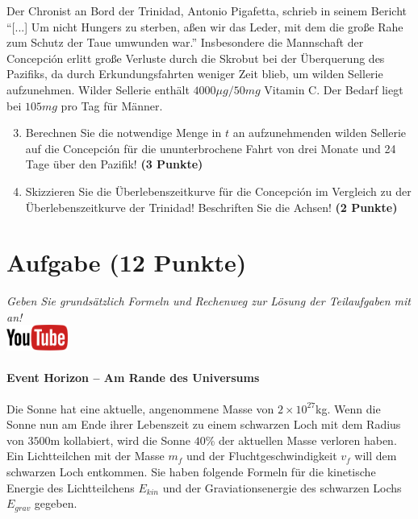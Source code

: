 \documentclass[a4paper, 9pt]{scrartcl}\usepackage[]{graphicx}\usepackage[]{xcolor}
\begin{document}
Der Chronist an Bord der Trinidad, Antonio Pigafetta, schrieb in seinem
Bericht "`[...] Um nicht Hungers zu sterben, a{\ss}en wir das Leder, mit dem
die gro{\ss}e Rahe zum Schutz der Taue umwunden war."' Insbesondere die
Mannschaft der Concepci{\'o}n erlitt gro{\ss}e Verluste durch die Skrobut bei der
{\"U}berquerung des Pazifiks, da durch Erkundungsfahrten weniger Zeit blieb, um
wilden Sellerie aufzunehmen. Wilder Sellerie enth{\"a}lt
$4000\mu g/50mg$ Vitamin C. Der Bedarf liegt bei
$105mg$ pro Tag f{\"u}r M{\"a}nner.

\begin{enumerate}
  \setcounter{enumi}{2}
\item Berechnen Sie die notwendige Menge in $t$ an
  aufzunehmenden wilden Sellerie auf die Concepci{\'o}n f{\"u}r die ununterbrochene
  Fahrt von drei Monate und 24 Tage {\"u}ber den Pazifik!
  \textbf{(3 Punkte)}
\item Skizzieren Sie die {\"U}berlebenszeitkurve f{\"u}r die Concepci{\'o}n im
  Vergleich zu der {\"U}berlebenszeitkurve der Trinidad! Beschriften Sie die
  Achsen! \textbf{(2 Punkte)}
\end{enumerate}

 
\clearpage

\section{Aufgabe \hfill (12 Punkte)}

\textit{Geben Sie grunds{\"a}tzlich Formeln und Rechenweg zur L{\"o}sung der
  Teilaufgaben mit an!} \\[1Ex]

\hfill\href{https://youtu.be/q-qYK4Chslg}{\includegraphics[width =
  2cm]{img/youtube}} %
\hspace{2Ex}

\paragraph{Event Horizon -- Am Rande des Universums}



Die Sonne hat eine aktuelle, angenommene Masse von $\ensuremath{2\times 10^{27}}$kg. Wenn
die Sonne nun am Ende ihrer Lebenszeit zu einem schwarzen Loch mit dem
Radius von $3500$m kollabiert, wird die Sonne $40$\%
der aktuellen Masse verloren haben. Ein Lichtteilchen mit der Masse $m_f$
und der Fluchtgeschwindigkeit $v_f$ will dem schwarzen Loch entkommen.  Sie
haben folgende Formeln f{\"u}r die kinetische Energie des Lichtteilchens
$E_{kin}$ und der Graviationsenergie des schwarzen Lochs $E_{grav}$
gegeben.
\end{document}
